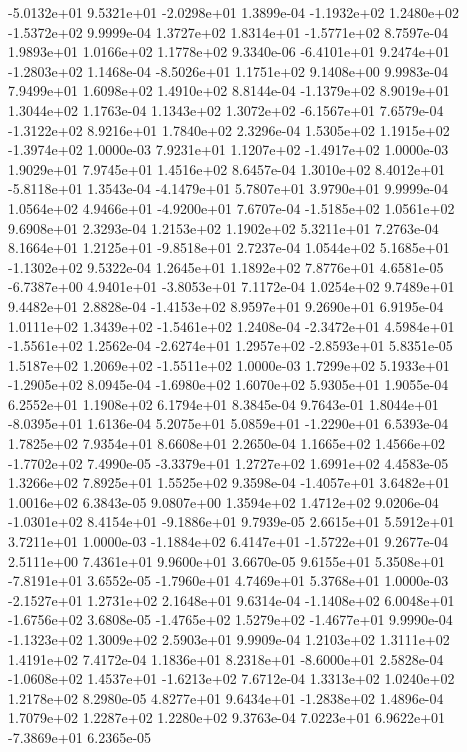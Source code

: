 -5.0132e+01  9.5321e+01 -2.0298e+01  1.3899e-04
-1.1932e+02  1.2480e+02 -1.5372e+02  9.9999e-04
 1.3727e+02  1.8314e+01 -1.5771e+02  8.7597e-04
1.9893e+01 1.0166e+02 1.1778e+02  9.3340e-06
-6.4101e+01  9.2474e+01 -1.2803e+02  1.1468e-04
-8.5026e+01  1.1751e+02  9.1408e+00  9.9983e-04
7.9499e+01 1.6098e+02 1.4910e+02  8.8144e-04
-1.1379e+02  8.9019e+01  1.3044e+02  1.1763e-04
 1.1343e+02  1.3072e+02 -6.1567e+01  7.6579e-04
-1.3122e+02  8.9216e+01  1.7840e+02  2.3296e-04
 1.5305e+02  1.1915e+02 -1.3974e+02  1.0000e-03
 7.9231e+01  1.1207e+02 -1.4917e+02  1.0000e-03
1.9029e+01 7.9745e+01 1.4516e+02  8.6457e-04
 1.3010e+02  8.4012e+01 -5.8118e+01  1.3543e-04
-4.1479e+01  5.7807e+01  3.9790e+01  9.9999e-04
 1.0564e+02  4.9466e+01 -4.9200e+01  7.6707e-04
-1.5185e+02  1.0561e+02  9.6908e+01  2.3293e-04
1.2153e+02 1.1902e+02 5.3211e+01  7.2763e-04
 8.1664e+01  1.2125e+01 -9.8518e+01  2.7237e-04
 1.0544e+02  5.1685e+01 -1.1302e+02  9.5322e-04
1.2645e+01 1.1892e+02 7.8776e+01  4.6581e-05
-6.7387e+00  4.9401e+01 -3.8053e+01  7.1172e-04
1.0254e+02 9.7489e+01 9.4482e+01  2.8828e-04
-1.4153e+02  8.9597e+01  9.2690e+01  6.9195e-04
 1.0111e+02  1.3439e+02 -1.5461e+02  1.2408e-04
-2.3472e+01  4.5984e+01 -1.5561e+02  1.2562e-04
-2.6274e+01  1.2957e+02 -2.8593e+01  5.8351e-05
 1.5187e+02  1.2069e+02 -1.5511e+02  1.0000e-03
 1.7299e+02  5.1933e+01 -1.2905e+02  8.0945e-04
-1.6980e+02  1.6070e+02  5.9305e+01  1.9055e-04
6.2552e+01 1.1908e+02 6.1794e+01  8.3845e-04
 9.7643e-01  1.8044e+01 -8.0395e+01  1.6136e-04
 5.2075e+01  5.0859e+01 -1.2290e+01  6.5393e-04
1.7825e+02 7.9354e+01 8.6608e+01  2.2650e-04
 1.1665e+02  1.4566e+02 -1.7702e+02  7.4990e-05
-3.3379e+01  1.2727e+02  1.6991e+02  4.4583e-05
1.3266e+02 7.8925e+01 1.5525e+02  9.3598e-04
-1.4057e+01  3.6482e+01  1.0016e+02  6.3843e-05
9.0807e+00 1.3594e+02 1.4712e+02  9.0206e-04
-1.0301e+02  8.4154e+01 -9.1886e+01  9.7939e-05
2.6615e+01 5.5912e+01 3.7211e+01  1.0000e-03
-1.1884e+02  6.4147e+01 -1.5722e+01  9.2677e-04
2.5111e+00 7.4361e+01 9.9600e+01  3.6670e-05
 9.6155e+01  5.3508e+01 -7.8191e+01  3.6552e-05
-1.7960e+01  4.7469e+01  5.3768e+01  1.0000e-03
-2.1527e+01  1.2731e+02  2.1648e+01  9.6314e-04
-1.1408e+02  6.0048e+01 -1.6756e+02  3.6808e-05
-1.4765e+02  1.5279e+02 -1.4677e+01  9.9990e-04
-1.1323e+02  1.3009e+02  2.5903e+01  9.9909e-04
1.2103e+02 1.3111e+02 1.4191e+02  7.4172e-04
 1.1836e+01  8.2318e+01 -8.6000e+01  2.5828e-04
-1.0608e+02  1.4537e+01 -1.6213e+02  7.6712e-04
1.3313e+02 1.0240e+02 1.2178e+02  8.2980e-05
 4.8277e+01  9.6434e+01 -1.2838e+02  1.4896e-04
1.7079e+02 1.2287e+02 1.2280e+02  9.3763e-04
 7.0223e+01  6.9622e+01 -7.3869e+01  6.2365e-05
